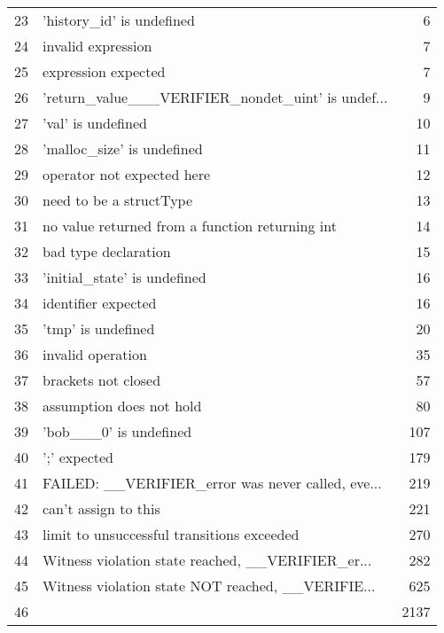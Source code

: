 \documentclass[notitlepage]{article}
\begin{document}
\begin{tabular}{llr}
23 &                          'history\_id' is undefined &      6 \\
24 &                                 invalid expression &      7 \\
25 &                                expression expected &      7 \\
26 &  'return\_value\_\_\_VERIFIER\_nondet\_uint' is undef... &      9 \\
27 &                                 'val' is undefined &     10 \\
28 &                         'malloc\_size' is undefined &     11 \\
29 &                         operator not expected here &     12 \\
30 &                            need to be a structType &     13 \\
31 &    no value returned from a function returning int &     14 \\
32 &                               bad type declaration &     15 \\
33 &                       'initial\_state' is undefined &     16 \\
34 &                                identifier expected &     16 \\
35 &                                 'tmp' is undefined &     20 \\
36 &                                  invalid operation &     35 \\
37 &                                brackets not closed &     57 \\
38 &                           assumption does not hold &     80 \\
39 &                             'bob\_\_\_0' is undefined &    107 \\
40 &                                       ';' expected &    179 \\
41 &  FAILED: \_\_VERIFIER\_error was never called, eve... &    219 \\
42 &                               can't assign to this &    221 \\
43 &         limit to unsuccessful transitions exceeded &    270 \\
44 &  Witness violation state reached, \_\_VERIFIER\_er... &    282 \\
45 &  Witness violation state NOT reached, \_\_VERIFIE... &    625 \\
46 &                                                    &   2137 \\
\bottomrule
\end{tabular}
\end{document}
